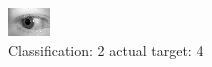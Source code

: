 \begin{figure}[h!]
\begin{center}
\includegraphics[width=0.60\columnwidth]{figures/ID833_class_2_target_4.png}
\end{center}
\caption{ Classification: 2 actual target: 4}
\label{fig:ID833_class_2_target_4}
\end{figure}

